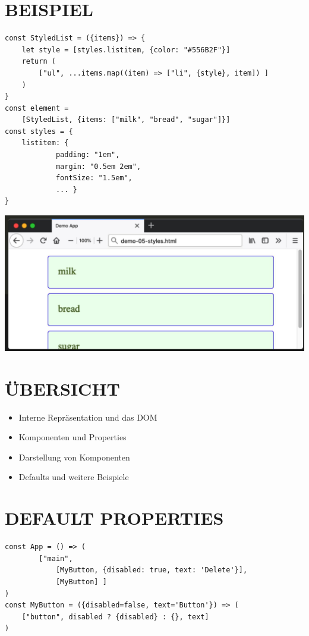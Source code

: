 \documentclass[10pt]{article}
\begin{document}
\section*{BEISPIEL}
\begin{verbatim}
const StyledList = ({items}) => {
    let style = [styles.listitem, {color: "#556B2F"}]
    return (
        ["ul", ...items.map((item) => ["li", {style}, item]) ]
    )
}
const element =
    [StyledList, {items: ["milk", "bread", "sugar"]}]
const styles = {
    listitem: {
            padding: "1em",
            margin: "0.5em 2em",
            fontSize: "1.5em",
            ... }
}
\end{verbatim}

\begin{center}
\includegraphics[max width=\textwidth]{2025_01_02_254b5e4c52d090c313e1g-35}
\end{center}

\section*{ÜBERSICHT}
\begin{itemize}
  \item Interne Repräsentation und das DOM
  \item Komponenten und Properties
  \item Darstellung von Komponenten
  \item Defaults und weitere Beispiele
\end{itemize}

\section*{DEFAULT PROPERTIES}
\begin{verbatim}
const App = () => (
        ["main",
            [MyButton, {disabled: true, text: 'Delete'}],
            [MyButton] ]
)
const MyButton = ({disabled=false, text='Button'}) => (
    ["button", disabled ? {disabled} : {}, text]
)
\end{verbatim}
\end{document}
